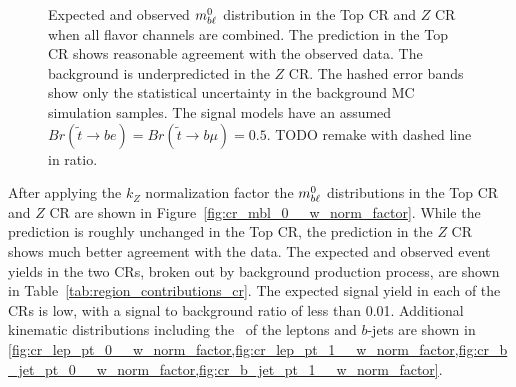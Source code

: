 \begin{figure}
  \centering
  \caption{Expected and observed $m_{b\ell}^0$ distribution in the Top CR and
    $Z$ CR when all flavor channels are combined.
    The prediction in the Top CR shows reasonable agreement with the observed
    data.
    The background is underpredicted in the $Z$ CR.
    The hashed error bands show only the statistical uncertainty in the
    background MC simulation samples.
    The signal models have an assumed
    $Br(\tilde{t}\rightarrow be) = Br(\tilde{t}\rightarrow b\mu) = 0.5$.
    {\color{red} TODO remake with dashed line in ratio.}
  }
  \label{fig:cr_mbl_0__no_norm_factor}
\end{figure}

After applying the $k_Z$ normalization factor the $m_{b\ell}^0$ distributions in
the Top CR and $Z$ CR are shown in Figure~\ref{fig:cr_mbl_0__w_norm_factor}.
While the prediction is roughly unchanged in the Top CR, the prediction in the
$Z$ CR shows much better agreement with the data.
The expected and observed event yields in the two CRs, broken out by background
production process, are shown in Table~\ref{tab:region_contributions_cr}.
The expected signal yield in each of the CRs is low, with a signal to
background ratio of less than 0.01.
Additional kinematic distributions including the \pt\ of the leptons and
$b$-jets are shown in
\cref{fig:cr_lep_pt_0__w_norm_factor,fig:cr_lep_pt_1__w_norm_factor,fig:cr_b_jet_pt_0__w_norm_factor,fig:cr_b_jet_pt_1__w_norm_factor}.

